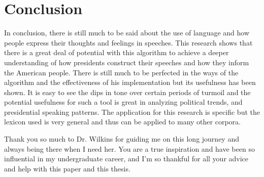 \documentclass[acmtog, review, screen]{acmart}
\begin{document}
\section{Conclusion}
In conclusion, there is still much to be said about the use of language and how people express their thoughts and feelings in speeches.
This research shows that there is a great deal of potential with this algorithm to achieve a deeper understanding of how presidents construct their speeches and how they inform the American people.
There is still much to be perfected in the ways of the algorithm and the effectiveness of his implementation but its usefulness has been shown.
It is easy to see the dips in tone over certain periods of turmoil and the potential usefulness for such a tool is great in analyzing political trends, and presidential speaking patterns.
The application for this research is specific but the lexicon used is very general and thus can be applied to many other corpora.




\begin{acks}
Thank you so much to Dr. Wilkins for guiding me on this long journey and always being there when I need her. You are a true inspiration and have been so influential in my undergraduate career, and I'm so thankful for all your advice and help with this paper and this thesis.
\end{acks}
\end{document}
